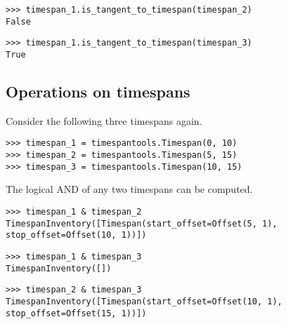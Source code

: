 \begin{singlespacing}
\vspace{-0.5\baselineskip}
\begin{lstlisting}
>>> timespan_1.is_tangent_to_timespan(timespan_2)
False
\end{lstlisting}
\begin{lstlisting}
>>> timespan_1.is_tangent_to_timespan(timespan_3)
True
\end{lstlisting}
\end{singlespacing}

\subsection{Operations on timespans}

Consider the following three timespans again.

\begin{comment}
<abjad>
timespan_1 = timespantools.Timespan(0, 10)
timespan_2 = timespantools.Timespan(5, 15)
timespan_3 = timespantools.Timespan(10, 15)
</abjad>
\end{comment}

\begin{singlespacing}
\vspace{-0.5\baselineskip}
\begin{lstlisting}
>>> timespan_1 = timespantools.Timespan(0, 10)
>>> timespan_2 = timespantools.Timespan(5, 15)
>>> timespan_3 = timespantools.Timespan(10, 15)
\end{lstlisting}
\end{singlespacing}

The logical AND of any two timespans can be computed.

\begin{comment}
<abjad>
timespan_1 & timespan_2
timespan_1 & timespan_3
timespan_2 & timespan_3
</abjad>
\end{comment}

\begin{singlespacing}
\vspace{-0.5\baselineskip}
\begin{lstlisting}
>>> timespan_1 & timespan_2
TimespanInventory([Timespan(start_offset=Offset(5, 1), stop_offset=Offset(10, 1))])
\end{lstlisting}
\begin{lstlisting}
>>> timespan_1 & timespan_3
TimespanInventory([])
\end{lstlisting}
\begin{lstlisting}
>>> timespan_2 & timespan_3
TimespanInventory([Timespan(start_offset=Offset(10, 1), stop_offset=Offset(15, 1))])
\end{lstlisting}
\end{singlespacing}

